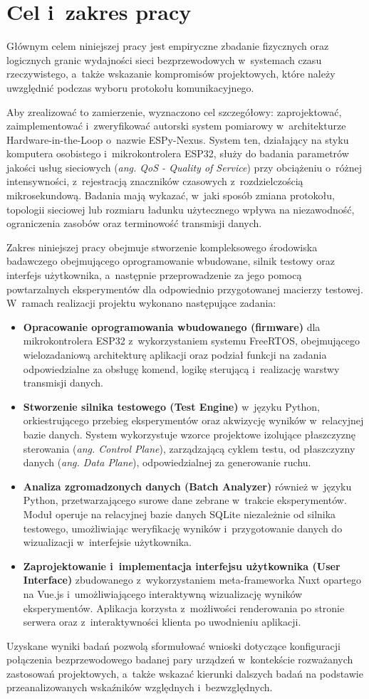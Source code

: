 \chapter{Cel i~zakres pracy}

Głównym celem niniejszej pracy jest empiryczne zbadanie fizycznych oraz logicznych granic wydajności sieci bezprzewodowych w~systemach czasu rzeczywistego, a~także wskazanie kompromisów projektowych, które należy uwzględnić podczas wyboru protokołu komunikacyjnego.

Aby zrealizować to zamierzenie, wyznaczono cel szczegółowy: zaprojektować, zaimplementować i~zweryfikować autorski system pomiarowy w~architekturze Hardware-in-the-Loop o~nazwie ESPy-Nexus.
System ten, działający na styku komputera osobistego i~mikrokontrolera ESP32, służy do badania parametrów jakości usług sieciowych (\textit{ang. QoS - Quality of Service}) przy obciążeniu o~różnej intensywności, z~rejestracją znaczników czasowych z~rozdzielczością mikrosekundową.
Badania mają wykazać, w~jaki sposób zmiana protokołu, topologii sieciowej lub rozmiaru ładunku użytecznego wpływa na niezawodność, ograniczenia zasobów oraz terminowość transmisji danych.

Zakres niniejszej pracy obejmuje stworzenie kompleksowego środowiska badawczego obejmującego oprogramowanie wbudowane, silnik testowy oraz interfejs użytkownika, a~następnie przeprowadzenie za jego pomocą powtarzalnych eksperymentów dla odpowiednio przygotowanej macierzy testowej.
W~ramach realizacji projektu wykonano następujące zadania:
\begin{itemize}
      \item \textbf{Opracowanie oprogramowania wbudowanego (firmware)}
            dla mikrokontrolera ESP32 z~wykorzystaniem systemu FreeRTOS, obejmującego wielozadaniową architekturę aplikacji oraz podział funkcji na zadania odpowiedzialne za obsługę komend, logikę sterującą i~realizację warstwy transmisji danych.
      \item \textbf{Stworzenie silnika testowego (Test Engine)}
            w~języku Python, orkiestrującego przebieg eksperymentów oraz akwizycję wyników w~relacyjnej bazie danych.
            System wykorzystuje wzorce projektowe izolujące płaszczyznę sterowania (\textit{ang. Control Plane}), zarządzającą cyklem testu, od płaszczyzny danych (\textit{ang. Data Plane}), odpowiedzialnej za generowanie ruchu.
      \item \textbf{Analiza zgromadzonych danych (Batch Analyzer)}
            również w~języku Python, przetwarzającego surowe dane zebrane w~trakcie eksperymentów.
            Moduł operuje na relacyjnej bazie danych SQLite niezależnie od silnika testowego, umożliwiając weryfikację wyników i~przygotowanie danych do wizualizacji w~interfejsie użytkownika.
      \item \textbf{Zaprojektowanie i~implementacja interfejsu użytkownika (User Interface)}
            zbudowanego z~wykorzystaniem meta-frameworka Nuxt opartego na Vue.js i~umożliwiającego interaktywną wizualizację wyników eksperymentów.
            Aplikacja korzysta z~możliwości renderowania po stronie serwera oraz z~interaktywności klienta po uwodnieniu aplikacji.
\end{itemize}

Uzyskane wyniki badań pozwolą sformułować wnioski dotyczące konfiguracji połączenia bezprzewodowego badanej pary urządzeń w~kontekście rozważanych zastosowań projektowych, a~także wskazać kierunki dalszych badań na podstawie przeanalizowanych wskaźników względnych i~bezwzględnych.
